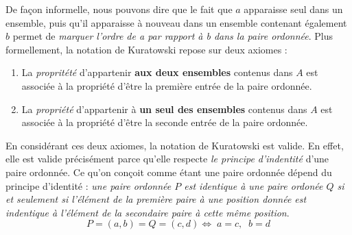 \documentclass[8pt]{report}
\begin{document}
    De façon informelle, nous pouvons dire que le fait que $a$ apparaisse seul dans un ensemble, puis qu'il apparaisse 
    à nouveau dans un ensemble contenant également $b$ permet de 
    \textit{marquer l'ordre de a par rapport à b dans la paire ordonnée}. 
    Plus formellement, la notation de Kuratowski repose sur deux axiomes :
    \begin{enumerate}
        \item La \textit{propritété} d'appartenir \textbf{aux deux ensembles} contenus dans 
            $A$ est associée à la propriété d'être la première entrée de la paire ordonnée. 

        \item La \textit{propriété} d'appartenir à \textbf{un seul des ensembles} contenus dans $A$ est 
            associée à la propriété d'être la seconde entrée de la paire ordonnée. 
    \end{enumerate}
    En considérant ces deux axiomes, la notation de Kuratowski est valide. En effet, elle est valide précisément parce  
    qu'elle respecte \textit{le principe d'indentité} d'une paire ordonnée. Ce qu'on conçoit comme étant une paire 
    ordonnée dépend du principe d'identité :
    \textit{une paire ordonnée $P$ est identique à une paire ordonée $Q$ si et seulement si l'élément de la première 
    paire à une position donnée est indentique à l'élément de la secondaire paire à cette même position}. 
    \[  P = (a,b) = Q = (c,d) \Leftrightarrow  \;a = c, \;\;b = d \] 
\end{document}
